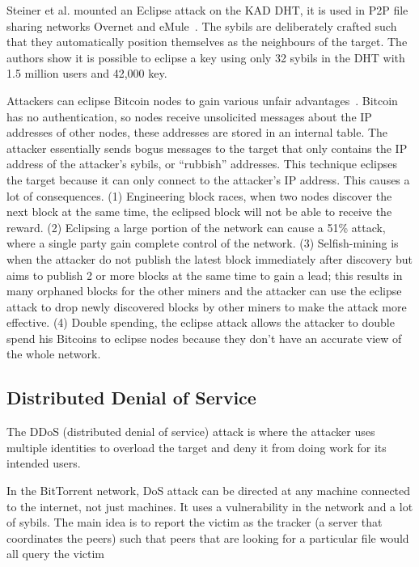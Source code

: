 Steiner et al. mounted an Eclipse attack on the KAD DHT, it is used in P2P file
sharing networks Overnet and eMule~\cite{steiner2007exploiting}. The sybils are
deliberately crafted such that they automatically position themselves as the
neighbours of the target. The authors show it is possible to eclipse a key using
only 32 sybils in the DHT with 1.5 million users and 42,000 key.

Attackers can eclipse Bitcoin nodes to gain various unfair
advantages~\cite{heilman2015eclipse}. Bitcoin has no authentication, so nodes
receive unsolicited messages about the IP addresses of other nodes, these
addresses are stored in an internal table. The attacker essentially sends bogus
messages to the target that only contains the IP address of the attacker's
sybils, or ``rubbish'' addresses. This technique eclipses the target because it
can only connect to the attacker's IP address. This causes a lot of
consequences. (1) Engineering block races, when two nodes discover the next
block at the same time, the eclipsed block will not be able to receive the
reward. (2) Eclipsing a large portion of the network can cause a 51\% attack,
where a single party gain complete control of the network. (3) Selfish-mining is
when the attacker do not publish the latest block immediately after discovery
but aims to publish 2 or more blocks at the same time to gain a lead; this
results in many orphaned blocks for the other miners and the attacker can use
the eclipse attack to drop newly discovered blocks by other miners to make the
attack more effective. (4) Double spending, the eclipse attack allows the
attacker to double spend his Bitcoins to eclipse nodes because they don't have
an accurate view of the whole network.

\subsection{Distributed Denial of Service}
The DDoS (distributed denial of service) attack is where the attacker uses
multiple identities to overload the target and deny it from doing work for its
intended users.

In the BitTorrent network, DoS attack can be directed at any machine connected
to the internet, not just machines. It uses a vulnerability in the network and a
lot of sybils. The main idea is to report the victim as the tracker (a server
that coordinates the peers) such that peers that are looking for a particular
file would all query the victim~\cite{sia2006ddos}


